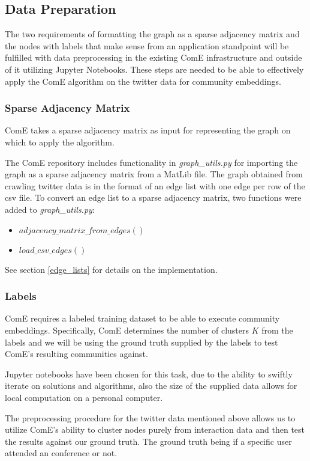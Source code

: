 \documentclass[sigconf]{acmart}
\begin{document}
\subsection{Data Preparation}

The two requirements of formatting the graph as a sparse adjacency matrix and the nodes with labels that make sense from an application standpoint will be fulfilled with data preprocessing in the existing ComE infrastructure and outside of it utilizing Jupyter Notebooks. These steps are needed to be able to effectively apply the ComE algorithm on the twitter data for community embeddings.

\subsubsection{Sparse Adjacency Matrix}
ComE takes a sparse adjacency matrix as input for representing the graph on which to apply the algorithm.

The ComE repository includes functionality in \textit{graph\_utils.py} for importing the graph as a sparse adjacency matrix from a MatLib file.\cite{ComE} The graph obtained from crawling twitter data is in the format of an edge list with one edge per row of the csv file. To convert an edge list to a sparse adjacency matrix, two functions were added to \textit{graph\_utils.py}:

\begin{itemize}
	\item $adjacency\_matrix\_from\_edges()$
	\item $load\_csv\_edges()$
\end{itemize}

See section \ref{edge_lists} for details on the implementation.

\subsubsection{Labels} ComE requires a labeled training dataset to be able to execute community embeddings. Specifically, ComE determines the number of clusters $K$ from the labels \cite{ComE} and we will be using the ground truth supplied by the labels to test ComE's resulting communities against.

Jupyter notebooks have been chosen for this task, due to the ability to swiftly iterate on solutions and algorithms, also the size of the supplied data allows for local computation on a personal computer.

The preprocessing procedure for the twitter data mentioned above allows us to utilize ComE's ability to cluster nodes purely from interaction data and then test the results against our ground truth. The ground truth being if a specific user attended an conference or not.
\end{document}
